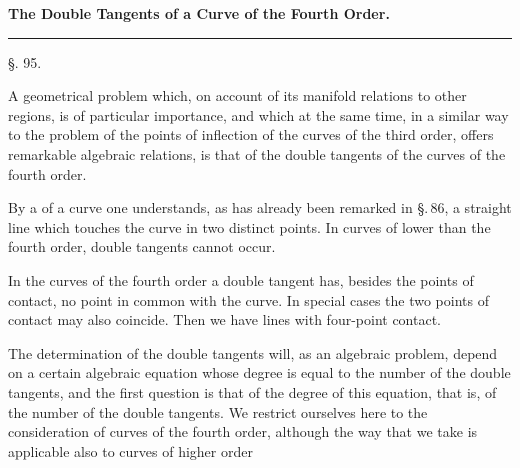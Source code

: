 \begin{center}

\textbf{The Double Tangents of a Curve of the Fourth Order.}

\rule{0.3\linewidth}{0.4pt}

§. 95.

\end{center}

A geometrical problem which, on account of its manifold relations to other regions, is of particular importance, and which at the same time, in a similar way to the problem of the points of inflection of the curves of the third order, offers remarkable algebraic relations, is that of the double tangents of the curves of the fourth order.

By a  of a curve one understands, as has already been remarked in \S.\,86, a straight line which touches the curve in two distinct points. In curves of lower than the fourth order, double tangents cannot occur.

In the curves of the fourth order a double tangent has, besides the points of contact, no point in common with the curve. In special cases the two points of contact may also coincide. Then we have lines with four-point contact.

The determination of the double tangents will, as an algebraic problem, depend on a certain algebraic equation whose degree is equal to the number of the double tangents, and the first question is that of the degree of this equation, that is, of the number of the double tangents. We restrict ourselves here to the consideration of curves of the fourth order, although the way that we take is applicable also to curves of higher order
